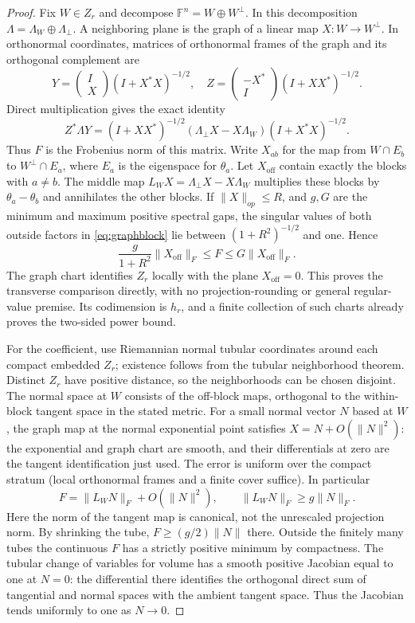 \documentclass[11pt]{article}
\begin{document}
\begin{proof}
Fix $W\in Z_r$ and decompose $\mathbb F^n=W\oplus W^\perp$. In this decomposition $\Lambda=\Lambda_W\oplus\Lambda_\perp$. A neighboring plane is the graph of a linear map $X:W\to W^\perp$. In orthonormal coordinates, matrices of orthonormal frames of the graph and its orthogonal complement are
\[
 Y=\begin{pmatrix}I\\X\end{pmatrix}(I+X^*X)^{-1/2},\quad
 Z=\begin{pmatrix}-X^*\\I\end{pmatrix}(I+XX^*)^{-1/2}.
\]
Direct multiplication gives the exact identity
\begin{equation}\label{eq:graphblock}
 Z^*\Lambda Y=(I+XX^*)^{-1/2}
 (\Lambda_\perp X-X\Lambda_W)(I+X^*X)^{-1/2}.
\end{equation}
Thus $F$ is the Frobenius norm of this matrix. Write $X_{ab}$ for the map from $W\cap E_b$ to $W^\perp\cap E_a$, where $E_a$ is the eigenspace for $\theta_a$. Let $X_{\mathrm{off}}$ contain exactly the blocks with $a\ne b$. The middle map $L_W X=\Lambda_\perp X-X\Lambda_W$ multiplies these blocks by $\theta_a-\theta_b$ and annihilates the other blocks. If $\|X\|_{op}\le R$, and $g,G$ are the minimum and maximum positive spectral gaps, the singular values of both outside factors in \eqref{eq:graphblock} lie between $(1+R^2)^{-1/2}$ and one. Hence
\begin{equation}\label{eq:graphcomparison}
 \frac{g}{1+R^2}\|X_{\mathrm{off}}\|_F\le F\le G\|X_{\mathrm{off}}\|_F.
\end{equation}
The graph chart identifies $Z_r$ locally with the plane $X_{\mathrm{off}}=0$. This proves the transverse comparison directly, with no projection-rounding or general regular-value premise. Its codimension is $h_r$, and a finite collection of such charts already proves the two-sided power bound.

For the coefficient, use Riemannian normal tubular coordinates around each compact embedded $Z_r$; existence follows from the tubular neighborhood theorem. Distinct $Z_r$ have positive distance, so the neighborhoods can be chosen disjoint. The normal space at $W$ consists of the off-block maps, orthogonal to the within-block tangent space in the stated metric. For a small normal vector $N$ based at $W$, the graph map at the normal exponential point satisfies $X=N+O(\|N\|^2)$: the exponential and graph chart are smooth, and their differentials at zero are the tangent identification just used. The error is uniform over the compact stratum (local orthonormal frames and a finite cover suffice). In particular
\[
 F=\|L_W N\|_F+O(\|N\|^2),\qquad \|L_W N\|_F\ge g\|N\|_F.
\]
Here the norm of the tangent map is canonical, not the unrescaled projection norm. By shrinking the tube, $F\ge (g/2)\|N\|$ there. Outside the finitely many tubes the continuous $F$ has a strictly positive minimum by compactness. The tubular change of variables for volume has a smooth positive Jacobian equal to one at $N=0$: the differential there identifies the orthogonal direct sum of tangential and normal spaces with the ambient tangent space. Thus the Jacobian tends uniformly to one as $N\to0$.


\end{proof}
\end{document}
